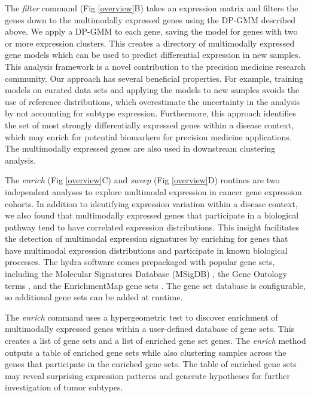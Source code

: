 \documentclass[10pt,letterpaper]{article}
\begin{document}
The \textit{filter} command (Fig \ref{overview}B) takes an expression matrix and filters the genes down to the multimodally expressed genes using the DP-GMM described above. We apply a DP-GMM to each gene, saving the model for genes with two or more expression clusters. This creates a directory of multimodally expressed gene models which can be used to predict differential expression in new samples. This analysis framework is a novel contribution to the precision medicine research community. Our approach has several beneficial properties. For example, training models on curated data sets and applying the models to new samples avoids the use of reference distributions, which overestimate the uncertainty in the analysis by not accounting for subtype expression. Furthermore, this approach identifies the set of most strongly differentially expressed genes within a disease context, which may enrich for potential biomarkers for precision medicine applications. The multimodally expressed genes are also used in downstream clustering analysis.

The \textit{enrich} (Fig \ref{overview}C) and \textit{sweep} (Fig \ref{overview}D) routines are two independent analyses to explore multimodal expression in cancer gene expression cohorts. In addition to identifying expression variation within a disease context, we also found that multimodally expressed genes that participate in a biological pathway tend to have correlated expression distributions. This insight facilitates the detection of multimodal expression signatures by enriching for genes that have multimodal expression distributions and participate in known biological processes. The hydra software comes prepackaged with popular gene sets, including the Molecular Signatures Database (MSigDB) \cite{liberzonMolecularSignaturesDatabase2011}, the Gene Ontology terms \cite{Ashburner2000, gene2018gene}, and the EnrichmentMap gene sets \cite{merico2010enrichment}. The gene set database is configurable, so additional gene sets can be added at runtime.

The \textit{enrich} command uses a hypergeometric test \cite{yuClusterProfilerPackageComparing2012} to discover enrichment of multimodally expressed genes within a user-defined database of gene sets. This creates a list of gene sets and a list of enriched gene set genes. The \textit{enrich} method outputs a table of enriched gene sets while also clustering samples across the genes that participate in the enriched gene sets. The table of enriched gene sets may reveal surprising expression patterns and generate hypotheses for further investigation of tumor subtypes.
\end{document}

